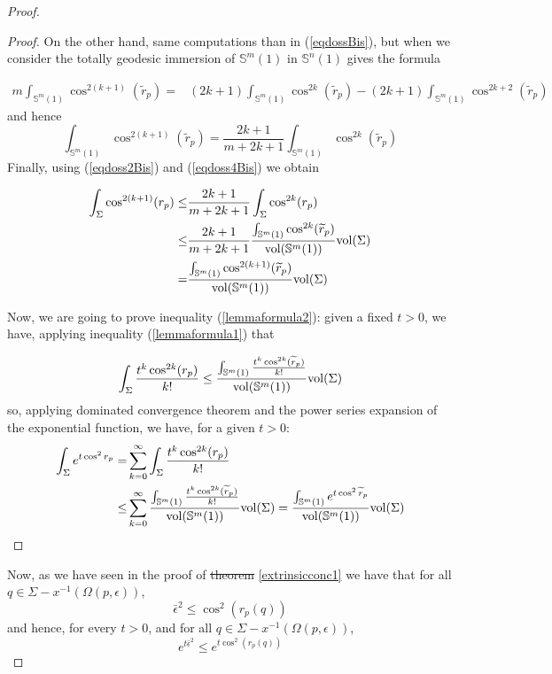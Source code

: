 \documentclass{amsart}
\theoremstyle{definition}
\theoremstyle{remark}
\newcommand{\ese}{\mathbb{S}}
\providecommand{\DIFadd}[1]{{\protect\color{blue}\uwave{#1}}} %
\providecommand{\DIFdel}[1]{{\protect\color{red}\sout{#1}}}                      %
\providecommand{\DIFaddbegin}{} %
\providecommand{\DIFaddend}{} %
\providecommand{\DIFdelbegin}{} %
\providecommand{\DIFdelend}{} %
\begin{document}
\begin{proof}
\begin{proof}
On the other hand, same computations than in (\ref{eqdossBis}), but when we consider the totally geodesic immersion of $\ese^m(1)$ in $\ese^n(1)$ gives the formula

$$
\begin{aligned}
m\int_{\ese^m(1)} \cos^{2(k+1)}(\widetilde{r}_p)=&(2k+1)\int_{\ese^m(1)}\cos^{2k}(\widetilde{r}_p)-(2k+1)\int_{\ese^m(1)} \cos^{2k+2}(\widetilde{r}_p)
\end{aligned}
$$
and hence
\begin{equation}\label{eqdoss4Bis}
\int_{\ese^m(1)} \cos^{2(k+1)}(\widetilde{r}_p)=\frac{2k+1}{m+2k+1}\int_{\ese^m(1)}\cos^{2k}(\widetilde{r}_p)
\end{equation}
Finally, using (\ref{eqdoss2Bis}) and (\ref{eqdoss4Bis}) we obtain

\begin{equation}\label{eqdoss5Bis}
\begin{aligned}
\int_\Sigma \cos^{2(k+1)}(r_p)\leq& \frac{2k+1}{m+2k+1}\int_\Sigma \cos^{2k}(r_p)\\  \leq & \frac{2k+1}{m+2k+1}\frac{\int_{\mathbb{S}^m(1)} \cos^{2k}(\widetilde{r}_p)}{{\rm vol}(\mathbb{S}^m(1))} {\rm vol}(\Sigma)\\
=&\frac{\int_{\mathbb{S}^m(1)} \cos^{2(k+1)}(\widetilde{r}_p)}{{\rm vol}(\mathbb{S}^m(1))} {\rm vol}(\Sigma)
\end{aligned}
\end{equation}

Now, we are going to prove inequality (\ref{lemmaformula2}): given a fixed $t>0$, we have, applying inequality (\ref{lemmaformula1}) that

$$\int_\Sigma\frac{t^k \cos^{2k}(r_p)}{k!} \leq \frac{\int_{\mathbb{S}^m(1)}\frac{t^k \cos^{2k}(\widetilde{r}_p)}{k!}}{{\rm vol}(\mathbb{S}^m(1))} {\rm vol}(\Sigma)$$
 so, applying dominated convergence theorem and the power series expansion of the exponential function, we have, for a given $t>0$:
$$
\begin{aligned}
\int_{\Sigma} e^{t \cos^2r_p} =&\sum_{k=0}^\infty \int_\Sigma\frac{t^k \cos^{2k}(r_p)}{k!} \\
\leq& 
\sum_{k=0}^\infty \frac{\int_{\mathbb{S}^m(1)}\frac{t^k \cos^{2k}(\widetilde{r}_p)}{k!}}{{\rm vol}(\mathbb{S}^m(1))} {\rm vol}(\Sigma)=\frac{\int_{\ese^m(1)} e^{t \cos^2\widetilde{r}_p}}{{\rm vol}(\mathbb{S}^m(1))} {\rm vol}(\Sigma)
\end{aligned}
$$
\end{proof}
Now, as we have seen in the proof of \DIFdelbegin \DIFdel{theorem }\DIFdelend \DIFaddbegin \DIFadd{Theorem }\DIFaddend \ref{extrinsicconc1}
we have that for all  $q \in\Sigma-x^{-1}(\Omega(p,\epsilon))$, 
$$ \bar\epsilon^2 \leq \cos^2(r_p(q))$$
and hence, for every $t >0$, and for all $q \in \Sigma- x^{-1}(\Omega(p,\epsilon))$,
$$e^{t\bar\epsilon^2} \leq e^{t\cos^2(r_p(q))} $$


\end{proof}
\end{document}
